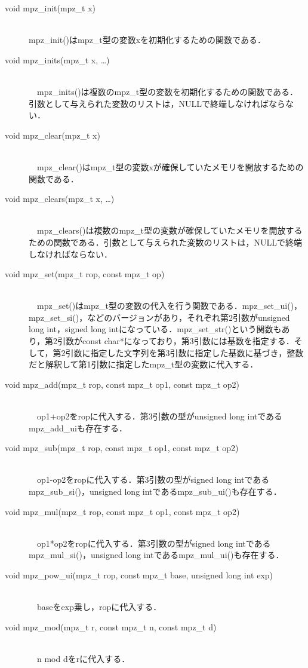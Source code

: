 \documentclass[openany,11pt,papersize]{jsbook}
\begin{document}
\begin{description}
 \item[void mpz\_init(mpz\_t x)]\mbox{}\\ 
mpz\_init()はmpz\_t型の変数xを初期化するための関数である．

\item[void mpz\_inits(mpz\_t x, …)]\mbox{}\\ 
　mpz\_inits()は複数のmpz\_t型の変数を初期化するための関数である．引数として与えられた変数のリストは，NULLで終端しなければならない．

\item[void mpz\_clear(mpz\_t x)]\mbox{}\\ 
　mpz\_clear()はmpz\_t型の変数xが確保していたメモリを開放するための関数である．

\item[void mpz\_clears(mpz\_t x, …)]\mbox{}\\ 
　mpz\_clears()は複数のmpz\_t型の変数が確保していたメモリを開放するための関数である．引数として与えられた変数のリストは，NULLで終端しなければならない．

\item[void mpz\_set(mpz\_t rop, const mpz\_t op)]\mbox{}\\ 
　mpz\_set()はmpz\_t型の変数の代入を行う関数である．mpz\_set\_ui()，mpz\_set\_si()，などのバージョンがあり，それぞれ第2引数がunsigned long int，signed long intになっている．mpz\_set\_str()という関数もあり，第2引数がconst char*になっており，第3引数には基数を指定する．そして，第2引数に指定した文字列を第3引数に指定した基数に基づき，整数だと解釈して第1引数に指定したmpz\_t型の変数に代入する．

\item[void mpz\_add(mpz\_t rop, const mpz\_t op1, const mpz\_t op2)]\mbox{}\\ 
　op1+op2をropに代入する．第3引数の型がunsigned long intであるmpz\_add\_uiも存在する．

\item[void mpz\_sub(mpz\_t rop, const mpz\_t op1, const mpz\_t op2)]\mbox{}\\ 
　op1-op2をropに代入する．第3引数の型がsigned long intであるmpz\_sub\_si()，unsigned long intであるmpz\_sub\_ui()も存在する．

\item[void mpz\_mul(mpz\_t rop, const mpz\_t op1, const mpz\_t op2)]\mbox{}\\ 
　op1*op2をropに代入する．第3引数の型がsigned long intであるmpz\_mul\_si()，unsigned long intであるmpz\_mul\_ui()も存在する．
	
\item[void mpz\_pow\_ui(mpz\_t rop, const mpz\_t base, unsigned long int exp)]\mbox{}\\ 
　baseをexp乗し，ropに代入する．

\item[void mpz\_mod(mpz\_t r, const mpz\_t n, const mpz\_t d)]\mbox{}\\ 
　n mod dをrに代入する．
\end{description}
\end{document}
